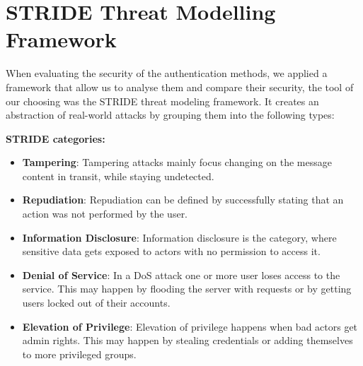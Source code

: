 \section{STRIDE Threat Modelling Framework}\label{sec:stride}
When evaluating the security of the authentication methods, we applied a framework that allow us to analyse them and compare their security, the tool of our choosing was the STRIDE threat modeling framework. It creates an abstraction of real-world attacks by grouping them into the following types:

\vspace{0.3em}
\noindent
\textbf{STRIDE categories:}
\begin{itemize}
  \item \textbf{Tampering}: Tampering attacks mainly focus changing on the message content in transit, while staying undetected.
  \item \textbf{Repudiation}: Repudiation can be defined by successfully stating that an action was not performed by the user.
  \item \textbf{Information Disclosure}: Information disclosure is the category, where sensitive data gets exposed to actors with no permission to access it.
  \item \textbf{Denial of Service}: In a DoS attack one or more user loses access to the service. This may  happen by flooding the server with requests or by getting users locked out of their accounts. 
  \item \textbf{Elevation of Privilege}: Elevation of privilege happens when bad actors get admin rights. This may happen by stealing credentials or adding themselves to more privileged groups.
\end{itemize}